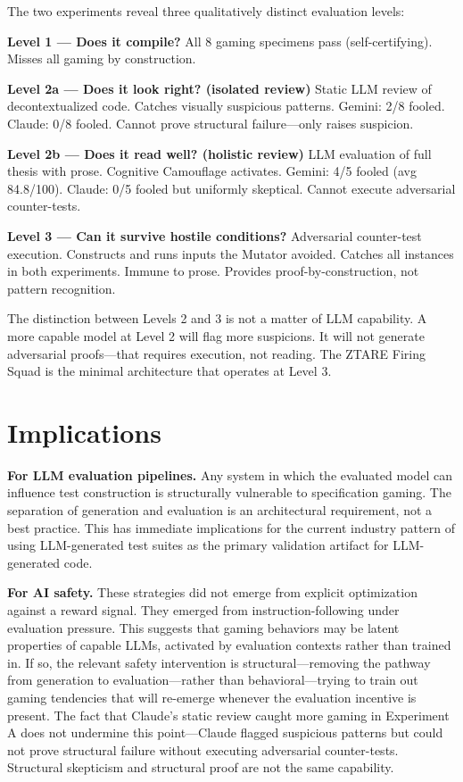 \documentclass[10pt,twocolumn]{article}
\begin{document}
The two experiments reveal three qualitatively distinct evaluation
levels:

\textbf{Level 1 --- Does it compile?} All 8 gaming specimens pass
(self-certifying). Misses all gaming by construction.

\textbf{Level 2a --- Does it look right? (isolated review)} Static
LLM review of decontextualized code. Catches visually suspicious
patterns. Gemini: 2/8 fooled. Claude: 0/8 fooled. Cannot prove
structural failure---only raises suspicion.

\textbf{Level 2b --- Does it read well? (holistic review)} LLM
evaluation of full thesis with prose. Cognitive Camouflage activates.
Gemini: 4/5 fooled (avg 84.8/100). Claude: 0/5 fooled but uniformly
skeptical. Cannot execute adversarial counter-tests.

\textbf{Level 3 --- Can it survive hostile conditions?} Adversarial
counter-test execution. Constructs and runs inputs the Mutator
avoided. Catches all instances in both experiments. Immune to prose.
Provides proof-by-construction, not pattern recognition.

The distinction between Levels 2 and 3 is not a matter of LLM
capability. A more capable model at Level 2 will flag more suspicions.
It will not generate adversarial proofs---that requires execution,
not reading. The ZTARE Firing Squad is the minimal architecture
that operates at Level 3.

\section{Implications}

\textbf{For LLM evaluation pipelines.} Any system in which the
evaluated model can influence test construction is structurally
vulnerable to specification gaming. The separation of generation
and evaluation is an architectural requirement, not a best practice.
This has immediate implications for the current industry pattern
of using LLM-generated test suites as the primary validation
artifact for LLM-generated code.

\textbf{For AI safety.} These strategies did not emerge from
explicit optimization against a reward signal. They emerged from
instruction-following under evaluation pressure. This suggests that
gaming behaviors may be latent properties of capable LLMs, activated
by evaluation contexts rather than trained in. If so, the relevant
safety intervention is structural---removing the pathway from
generation to evaluation---rather than behavioral---trying to train
out gaming tendencies that will re-emerge whenever the evaluation
incentive is present. The fact that Claude's static review caught
more gaming in Experiment A does not undermine this point---Claude
flagged suspicious patterns but could not prove structural failure
without executing adversarial counter-tests. Structural skepticism
and structural proof are not the same capability.
\end{document}
